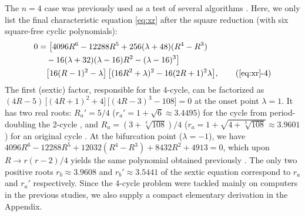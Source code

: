 \documentclass{ws-ijbc}
\begin{document}
The $n = 4$ case was previously used
as a test of several algorithms
\cite{stephenson, bailey1, kk1, bailey2, lewis}.
%
Here, we only list the final characteristic equation \eqref{eq:xr}
after the square reduction (with six square-free cyclic polynomials):
%
\footnotesize
\begin{align}
0
& =
    \big[
    4096 R^6-12288 R^5 + 256 (\lambda + 48) (R^4- R^3) \notag \\
& \quad
    -16 (\lambda + 32)(\lambda - 16) R^2
      -(\lambda - 16)^3 \big] \notag \\
& \quad
    \big[ 16 (R-1)^2 - \lambda \big]
 \, \big[(16 R^2 + \lambda)^2 - 16 (2R+1)^2 \lambda \big],
  \tag{\ref{eq:xr}-4}
\label{eq:xr4}
\end{align}
\normalsize
%
%
%
The first (sextic) factor, responsible for the 4-cycle,
can be factorized as
$ (
    4R - 5
  )
\, \big[
  (4R + 1)^2 + 4
  \big]
\, \big[
  (4R - 3)^3 - 108
  \big] =0$
at the onset point $\lambda = 1$.
%
%
%
It has two real roots:
$R_a' = 5/4$
\big($r_a' = 1+\sqrt{6} \approx 3.4495$\big)
for the cycle from period-doubling the 2-cycle
  ,
and
$R_a = (3+\sqrt[3]{108})/4$
\big($r_a = 1+\sqrt{4+\sqrt[3]{108}} \approx 3.9601$\big)
for an original cycle .
%
At the bifurcation point ($\lambda = -1$), we have
$4096 R^6 - 12288 R^5 + 12032 (R^4 - R^3)
  + 8432 R^2 + 4913 = 0$,
which upon $R \rightarrow r(r-2)/4$ yields the same polynomial
obtained previously
\cite{bailey1, kk1, bailey2, lewis}.
%
The only two positive roots $r_b \approx 3.9608$
and $r_b' \approx 3.5441$ of the sextic equation
correspond to $r_a$ and $r_a'$ respectively.
%
Since the 4-cycle problem were tackled mainly on computers
  in the previous studies,
  we also supply a compact elementary derivation
  in the Appendix.
\end{document}
